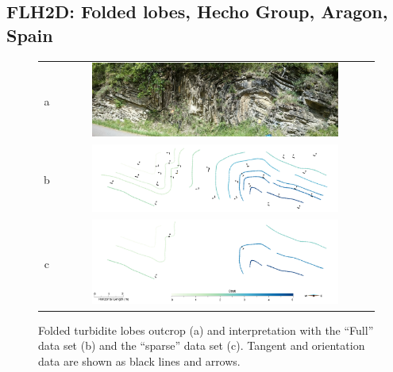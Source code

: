 \documentclass[preprint]{elsarticle}
\begin{document}
\subsection{FLH2D: Folded lobes, Hecho Group, Aragon, Spain}

\begin{figure}
\centering\begin{tabular}{cc}
a & \includegraphics[width=0.8\textwidth]{Hecho1}\\
b & \includegraphics[width=0.8\textwidth]{Hecho2} \\
c & \includegraphics[width=0.8\textwidth]{Hecho3} \\
\end{tabular}
\caption{Folded turbidite lobes outcrop (a) and interpretation with the ``Full'' data set (b) and the ``sparse'' data set (c). 
Tangent and orientation data are shown as black lines and arrows.}
\label{fig:FLH2D}
\end{figure}

\end{document}
